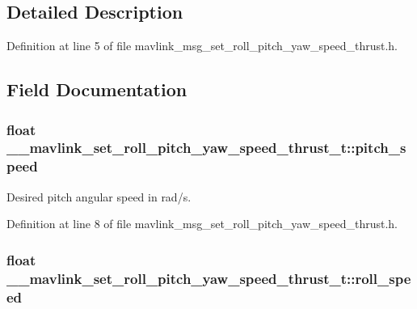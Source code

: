 \subsection{Detailed Description}


Definition at line 5 of file mavlink\-\_\-msg\-\_\-set\-\_\-roll\-\_\-pitch\-\_\-yaw\-\_\-speed\-\_\-thrust.\-h.



\subsection{Field Documentation}
\hypertarget{struct____mavlink__set__roll__pitch__yaw__speed__thrust__t_aa9115ddbf417ab7ed71bcc825fd3c63a}{
\subsubsection[{pitch\-\_\-speed}]{\setlength{\rightskip}{0pt plus 5cm}float \-\_\-\-\_\-mavlink\-\_\-set\-\_\-roll\-\_\-pitch\-\_\-yaw\-\_\-speed\-\_\-thrust\-\_\-t\-::pitch\-\_\-speed}}\label{struct____mavlink__set__roll__pitch__yaw__speed__thrust__t_aa9115ddbf417ab7ed71bcc825fd3c63a}


Desired pitch angular speed in rad/s. 



Definition at line 8 of file mavlink\-\_\-msg\-\_\-set\-\_\-roll\-\_\-pitch\-\_\-yaw\-\_\-speed\-\_\-thrust.\-h.

\hypertarget{struct____mavlink__set__roll__pitch__yaw__speed__thrust__t_a5e01bd44de6632b3e1fe3bbb5e6c99ce}{
\subsubsection[{roll\-\_\-speed}]{\setlength{\rightskip}{0pt plus 5cm}float \-\_\-\-\_\-mavlink\-\_\-set\-\_\-roll\-\_\-pitch\-\_\-yaw\-\_\-speed\-\_\-thrust\-\_\-t\-::roll\-\_\-speed}}\label{struct____mavlink__set__roll__pitch__yaw__speed__thrust__t_a5e01bd44de6632b3e1fe3bbb5e6c99ce}


